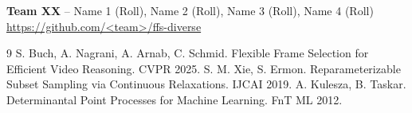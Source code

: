 \documentclass[10pt]{article}
\begin{document}
\noindent\textbf{Team XX} -- Name 1 (Roll), Name 2 (Roll), Name 3 (Roll), Name 4 (Roll) \hfill \url{https://github.com/<team>/ffs-diverse}

\begin{thebibliography}{9}\footnotesize\setlength{\itemsep}{0pt}
 S. Buch, A. Nagrani, A. Arnab, C. Schmid. Flexible Frame Selection for Efficient Video Reasoning. CVPR 2025.
 S. M. Xie, S. Ermon. Reparameterizable Subset Sampling via Continuous Relaxations. IJCAI 2019.
 A. Kulesza, B. Taskar. Determinantal Point Processes for Machine Learning. FnT ML 2012.
\end{thebibliography}
\end{document}
